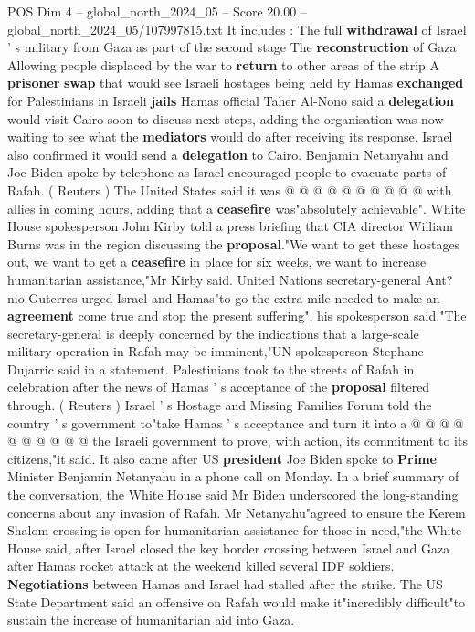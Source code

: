\begin{textsample}{POS Dim 4 – global\_north\_2024\_05 – Score 20.00 – global\_north\_2024\_05/107997815.txt}
It includes : The full \textbf{withdrawal} of Israel ' s military from Gaza as part of the second stage The \textbf{reconstruction} of Gaza Allowing people displaced by the war to \textbf{return} to other areas of the strip A \textbf{prisoner} \textbf{swap} that would see Israeli hostages being held by Hamas \textbf{exchanged} for Palestinians in Israeli \textbf{jails} Hamas official Taher Al-Nono said a \textbf{delegation} would visit Cairo soon to discuss next steps, adding the organisation was now waiting to see what the \textbf{mediators} would do after receiving its response.
Israel also confirmed it would send a \textbf{delegation} to Cairo.
Benjamin Netanyahu and Joe Biden spoke by telephone as Israel encouraged people to evacuate parts of Rafah. ( Reuters ) The United States said it was @ @ @ @ @ @ @ @ @ @ with allies in coming hours, adding that a \textbf{ceasefire} was"absolutely achievable".
White House spokesperson John Kirby told a press briefing that CIA director William Burns was in the region discussing the \textbf{proposal}."We want to get these hostages out, we want to get a \textbf{ceasefire} in place for six weeks, we want to increase humanitarian assistance,"Mr Kirby said.
United Nations secretary-general Ant? nio Guterres urged Israel and Hamas"to go the extra mile needed to make an \textbf{agreement} come true and stop the present suffering", his spokesperson said."The secretary-general is deeply concerned by the indications that a large-scale military operation in Rafah may be imminent,"UN spokesperson Stephane Dujarric said in a statement.
Palestinians took to the streets of Rafah in celebration after the news of Hamas ' s acceptance of the \textbf{proposal} filtered through. ( Reuters ) Israel ' s Hostage and Missing Families Forum told the country ' s government to"take Hamas ' s acceptance and turn it into a @ @ @ @ @ @ @ @ @ @ the Israeli government to prove, with action, its commitment to its citizens,"it said.
It also came after US \textbf{president} Joe Biden spoke to \textbf{Prime} Minister Benjamin Netanyahu in a phone call on Monday.
In a brief summary of the conversation, the White House said Mr Biden underscored the long-standing concerns about any invasion of Rafah.
Mr Netanyahu"agreed to ensure the Kerem Shalom crossing is open for humanitarian assistance for those in need,"the White House said, after Israel closed the key border crossing between Israel and Gaza after Hamas rocket attack at the weekend killed several IDF soldiers. \textbf{Negotiations} between Hamas and Israel had stalled after the strike.
The US State Department said an offensive on Rafah would make it"incredibly difficult"to sustain the increase of humanitarian aid into Gaza.

\end{textsample}
